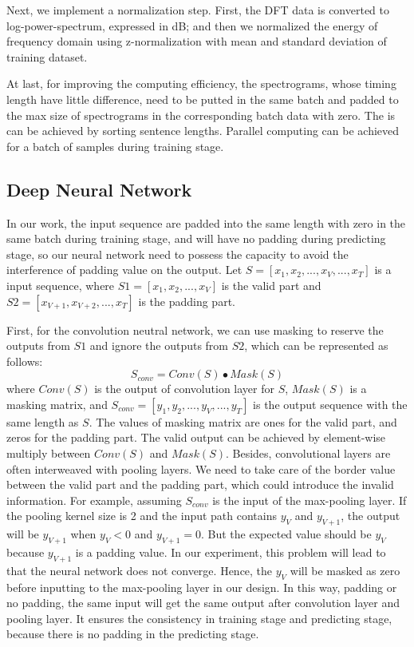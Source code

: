 \documentclass[a4paper]{article}
\begin{document}
Next, we implement a normalization step. First, the DFT data is converted to log-power-spectrum, expressed in dB; and then we normalized the energy of frequency domain using z-normalization with mean and standard deviation of training dataset.

At last, for improving the computing efficiency, the spectrograms, whose timing length have little difference, need to be putted in the same batch and padded to the max size of spectrograms in the corresponding batch data with zero. The is can be achieved by sorting sentence lengths. Parallel computing can be achieved for a batch of samples during training stage.

\subsection{Deep Neural Network}
\label{ssec:deep_neural_network}

In our work, the input sequence are padded into the same length with zero in the same batch during training stage, and will have no padding during predicting stage, so our neural network need to possess the capacity to avoid the interference of padding value on the output.  Let $S=[x_1, x_2, ..., x_V, ..., x_T]$ is a input sequence, where $S1=[x_1, x_2, ..., x_V]$ is the valid part and $S2=[x_{V+1}, x_{V+2}, ..., x_T]$ is the padding part.

First, for the convolution neutral network, we can use masking to reserve the outputs from $S1$ and ignore the outputs from $S2$, which can be represented as follows:
\begin{equation}
\label{eq:masking}
S_{conv}=Conv(S) \bullet Mask(S)
\end{equation}
where $Conv(S)$ is the output of convolution layer for $S$, $Mask(S)$ is a masking matrix, and $S_{conv}=[y_1, y_2, ..., y_V, ..., y_T]$ is the output sequence with the same length as $S$. The values of masking matrix are ones for the valid part, and zeros for the padding part. The valid output can be achieved by element-wise multiply between $Conv(S)$ and $Mask(S)$. Besides, convolutional layers are often interweaved with pooling layers. We need to take care of the border value between the valid part and the padding part, which could introduce the invalid information. For example, assuming $S_{conv}$ is the input of the max-pooling layer. If the pooling kernel size is 2 and the input path contains $y_V$ and $y_{V+1}$, the output will be $y_{V+1}$ when $y_V<0$ and $y_{V+1}=0$. But the expected value should be $y_V$ because $y_{V+1}$ is a padding value. In our experiment, this problem will lead to that the neural network does not converge. Hence, the $y_V$ will be masked as zero before inputting to the max-pooling layer in our design. In this way, padding or no padding, the same input will get the same output after convolution layer and pooling layer. It ensures the consistency in training stage and predicting stage, because there is no padding in the predicting stage.
\end{document}

